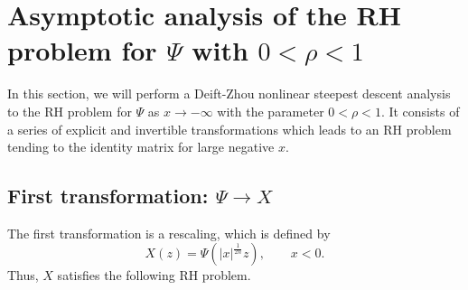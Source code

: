 \documentclass[11pt,a4paper]{article}
\numberwithin{equation}{section}
\begin{document}






\section{Asymptotic analysis of the RH problem for $\Psi$ with $0<\rho<1$}\label{RHanalysis1}
In this section, we  will perform a Deift-Zhou nonlinear steepest descent analysis to the RH problem for $\Psi$ as $x\to-\infty$ with the parameter $0<\rho<1$. It consists of a series of explicit and invertible transformations which leads
to an RH problem tending to the identity matrix for large negative $x$.

\subsection{First transformation: $\Psi \to X$}
The first transformation is a rescaling, which is defined by
\begin{equation}\label{rescaling}
X(z)=\Psi\left(|x|^{\frac{1}{2n}}z\right), \qquad x<0.
\end{equation}
Thus, $X$ satisfies the following RH problem.
\end{document}
